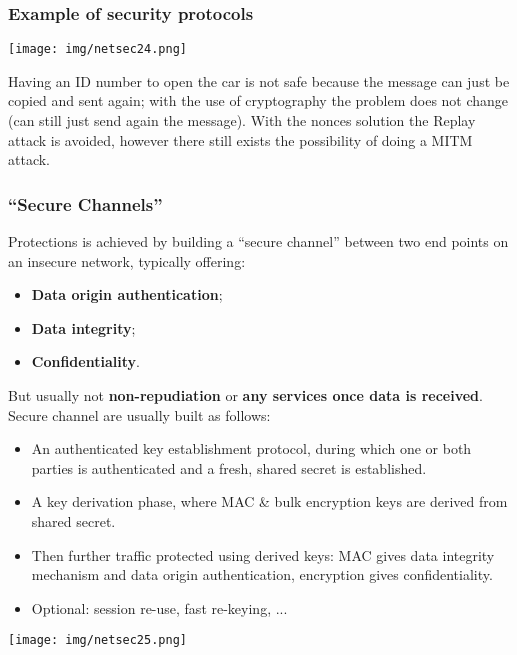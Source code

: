 \documentclass[a4paper, 10pt, titlepage]{article}
\begin{document}
\subsubsection*{Example of security protocols}
\begin{center}
	\texttt{[image: img/netsec24.png]}
\end{center}
Having an ID number to open the car is not safe because the message can just be copied and sent again; with the use of cryptography the problem does not change (can still just send again the message).
With the nonces solution the Replay attack is avoided, however there still exists the possibility of doing a MITM attack.

\subsubsection*{“Secure Channels”}
Protections is achieved by building a “secure channel” between two end points on an insecure network, typically offering:
\begin{itemize}
	\item \textbf{Data origin authentication};
	\item \textbf{Data integrity};
	\item \textbf{Confidentiality}.
\end{itemize}
But usually not \textbf{non-repudiation} or \textbf{any services once data is received}. \medskip\\
Secure channel are usually built as follows:
\begin{itemize}
	\item An authenticated key establishment protocol, during which one or both parties is authenticated and a fresh, shared secret is established.
	\item A key derivation phase, where MAC \& bulk encryption keys are derived from shared secret.
	\item Then further traffic protected using derived keys: MAC gives data integrity mechanism and data origin 	authentication, encryption gives confidentiality.
	\item Optional: session re-use, fast re-keying, ...
\end{itemize}
\begin{center}
	\texttt{[image: img/netsec25.png]}
\end{center}
\end{document}
